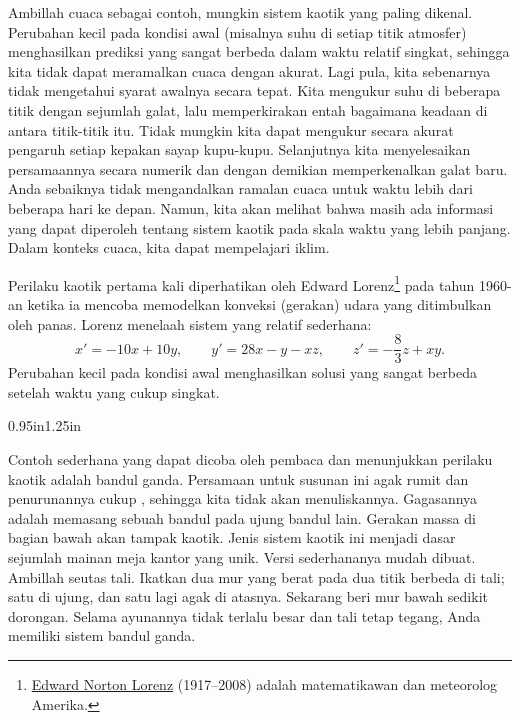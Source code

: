 Ambillah cuaca sebagai contoh, mungkin sistem kaotik yang paling dikenal.
Perubahan kecil pada kondisi awal
(misalnya suhu di setiap titik atmosfer) menghasilkan prediksi yang sangat
berbeda dalam waktu relatif singkat, sehingga kita tidak dapat meramalkan
cuaca dengan akurat.  Lagi pula, kita sebenarnya tidak mengetahui syarat
awalnya secara tepat.  Kita mengukur suhu di beberapa titik dengan sejumlah
galat, lalu memperkirakan entah bagaimana keadaan di antara titik-titik itu.
Tidak mungkin kita dapat mengukur secara akurat pengaruh setiap kepakan sayap
kupu-kupu.  Selanjutnya kita menyelesaikan persamaannya secara numerik dan
dengan demikian memperkenalkan galat baru.  Anda sebaiknya tidak mengandalkan
ramalan cuaca untuk waktu lebih dari beberapa hari ke depan.  Namun, kita akan
melihat bahwa masih ada informasi yang dapat diperoleh tentang sistem kaotik
pada skala waktu yang lebih panjang.  Dalam konteks cuaca, kita dapat
mempelajari iklim.

Perilaku kaotik pertama kali diperhatikan oleh Edward
Lorenz\footnote{\href{https://en.wikipedia.org/wiki/Edward_Norton_Lorenz}{Edward Norton Lorenz} (1917--2008) adalah
matematikawan dan meteorolog Amerika.}
pada tahun 1960-an ketika ia mencoba memodelkan konveksi (gerakan) udara yang
ditimbulkan oleh panas.  Lorenz menelaah sistem yang relatif sederhana:
\begin{equation*}
x' = -10x +10y, \qquad y' = 28x-y-xz, \qquad z'=-\frac{8}{3}z + xy .
\end{equation*}
Perubahan kecil pada kondisi awal menghasilkan solusi yang sangat berbeda
setelah waktu yang cukup singkat.

\begin{mywrapfigsimp}{0.95in}{1.25in}
\noindent
{}
\end{mywrapfigsimp}
Contoh sederhana yang dapat dicoba oleh pembaca dan menunjukkan perilaku
kaotik adalah bandul ganda.  Persamaan untuk susunan ini agak rumit dan
penurunannya cukup
, sehingga kita tidak akan menuliskannya.  Gagasannya
adalah memasang sebuah bandul pada ujung bandul lain.  Gerakan massa di bagian
bawah akan tampak kaotik.  Jenis sistem kaotik ini menjadi dasar sejumlah
mainan meja kantor yang unik.  Versi sederhananya mudah dibuat.  Ambillah
seutas tali.  Ikatkan dua mur yang berat pada dua titik berbeda di tali;
satu di ujung, dan satu lagi agak di atasnya.  Sekarang beri mur bawah sedikit
dorongan.  Selama ayunannya tidak terlalu besar dan tali tetap tegang, Anda
memiliki sistem bandul ganda.

